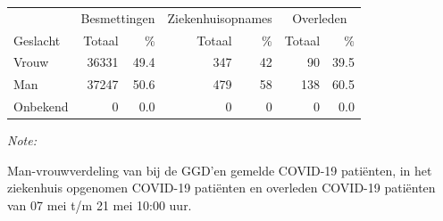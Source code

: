 \documentclass[
  english,
  man,floatsintext]{apa6}
\begin{document}
\begin{table}
\centering\begingroup\fontsize{11}{13}\selectfont

\begin{threeparttable}
\begin{tabular}{lrrrrrr}
\toprule
\multicolumn{1}{c}{ } & \multicolumn{2}{c}{Besmettingen} & \multicolumn{2}{c}{Ziekenhuisopnames} & \multicolumn{2}{c}{Overleden} \\
\cmidrule(l{3pt}r{3pt}){2-3} \cmidrule(l{3pt}r{3pt}){4-5} \cmidrule(l{3pt}r{3pt}){6-7}
Geslacht & Totaal & \% & Totaal & \% & Totaal & \%\\
\midrule
Vrouw & 36331 & 49.4 & 347 & 42 & 90 & 39.5\\
Man & 37247 & 50.6 & 479 & 58 & 138 & 60.5\\
Onbekend & 0 & 0.0 & 0 & 0 & 0 & 0.0\\
\bottomrule
\end{tabular}
\begin{tablenotes}
\item \textit{Note: } 
\item Man-vrouwverdeling van bij de GGD’en gemelde COVID-19 patiënten, in het ziekenhuis opgenomen COVID-19 patiënten en overleden COVID-19 patiënten van 07 mei t/m 21 mei 10:00 uur.
\end{tablenotes}
\end{threeparttable}
\endgroup{}
\end{table}
\newpage
\end{document}
